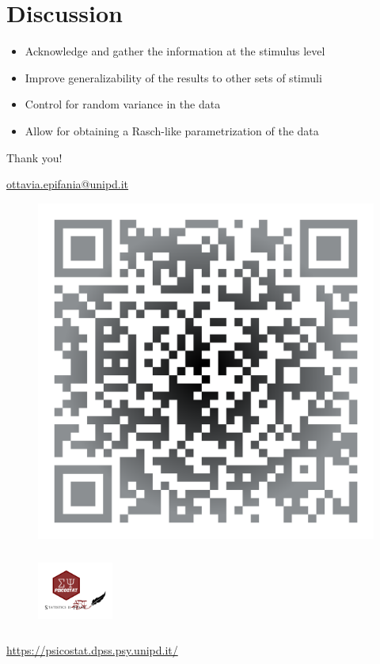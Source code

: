 \documentclass[compress]{beamer}
\begin{document}
\section{Discussion}

\begin{frame}
	\begin{itemize}
		\item Acknowledge and gather the information at the stimulus level
		
		\vspace{2.5mm}
	\item Improve generalizability of the results to other sets of stimuli 
\vspace{2.5mm}

\item Control for random variance in the data 
\vspace{2.5mm}

\item Allow for obtaining a Rasch-like parametrization of the data 

	\end{itemize}
\end{frame}


\begin{frame}[plain]
			
	\vspace*{2.5mm}
	\begin{center}
		\begin{Large}
			Thank you!
		\end{Large}

		\url{ottavia.epifania@unipd.it}
	\end{center}
	

	\begin{figure}
		\centering
		\includegraphics[width=0.3\linewidth]{img/qr}
	\end{figure}
	
	\begin{figure}
		\includegraphics[width=2.5cm,height=2.5cm,keepaspectratio]{img/psicostat.png}
	\end{figure}
	
	\begin{center}
		\url{https://psicostat.dpss.psy.unipd.it/}
	\end{center}

\end{frame}
\end{document}
